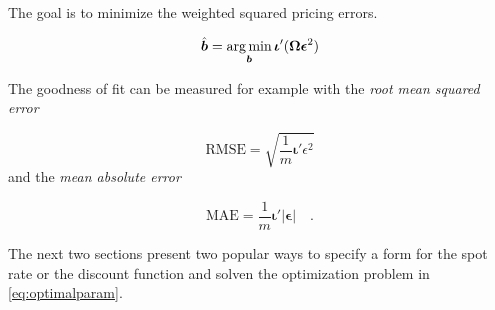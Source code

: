 The goal is to minimize the weighted squared pricing errors.


\begin{equation}
  \label{eq:optimalparam}
  \hat{\bm{b}}= \operatorname*{arg\,min}_{\bm{b}}\bm{\iota}'(\bm{\Omega}\bm{\epsilon}^2)
\end{equation}

The goodness of fit can be measured for example with the \emph{root mean squared error}

\begin{equation}
  \label{eq:rmse}
  \mbox{RMSE}=\sqrt{\frac{1}{m}\bm{\iota}'\epsilon^2}
\end{equation}
and the \emph{mean absolute error}

\begin{equation}
  \label{eq:mae}
  \mbox{MAE}=\frac{1}{m}\bm{\iota}'|\bm{\epsilon}|\quad.
\end{equation}

The next two sections present two popular ways to specify a form for the spot rate or the discount function and solven the optimization problem in \eqref{eq:optimalparam}.


